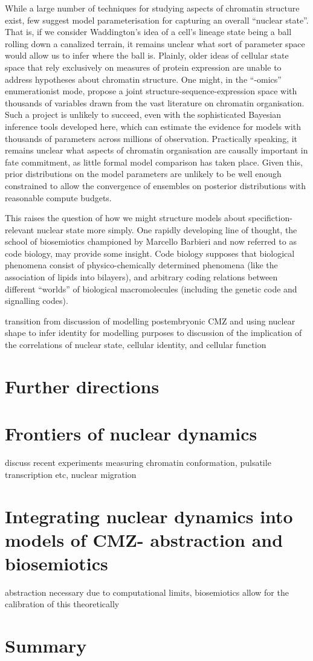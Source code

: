 While a large number of techniques for studying aspects of chromatin structure exist, few suggest model parameterisation for capturing an overall ``nuclear state''. That is, if we consider Waddington's idea of a cell's lineage state being a ball rolling down a canalized terrain, it remains unclear what sort of parameter space would allow us to infer where the ball is. Plainly, older ideas of cellular state space that rely exclusively on measures of protein expression are unable to address hypotheses about chromatin structure. One might, in the ``-omics'' enumerationist mode, propose a joint structure-sequence-expression space with thousands of variables drawn from the vast literature on chromatin organisation. Such a project is unlikely to succeed, even with the sophisticated Bayesian inference tools developed here, which can estimate the evidence for models with thousands of parameters across millions of observation. Practically speaking, it remains unclear what aspects of chromatin organisation are causally important in fate commitment, as little formal model comparison has taken place. Given this, prior distributions on the model parameters are unlikely to be well enough constrained to allow the convergence of ensembles on posterior distributions with reasonable compute budgets.

This raises the question of how we might structure models about specifiction-relevant nuclear state more simply. One rapidly developing line of thought, the school of biosemiotics championed by Marcello Barbieri and now referred to as code biology, may provide some insight. Code biology supposes that biological phenomena consist of physico-chemically determined phenomena (like the association of lipids into bilayers), and arbitrary coding relations between different ``worlds'' of biological macromolecules (including the genetic code and signalling codes).

transition from discussion of modelling postembryonic CMZ and using nuclear shape to infer identity for modelling purposes to discussion of the implication of the correlations of nuclear state, cellular identity, and cellular function

\section{Further directions}

\section{Frontiers of nuclear dynamics}
discuss recent experiments measuring chromatin conformation, pulsatile transcription etc, nuclear migration
\section{Integrating nuclear dynamics into models of CMZ- abstraction and biosemiotics}
abstraction necessary due to computational limits, biosemiotics allow for the calibration of this theoretically


\section{Summary}